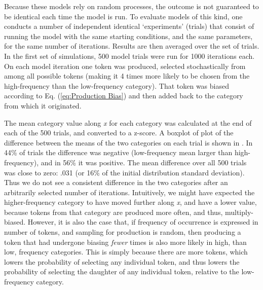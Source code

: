 Because these models rely on random processes, the outcome is not
guaranteed to be identical each time the model is run. To evaluate
models of this kind, one conducts a number of independent identical
`experiments' (trials) that consist of running the model with the
same starting conditions, and the same parameters, for the same number
of iterations. Results are then averaged over the set of trials. In
the first set of simulations, 500 model trials were run for 1000 iterations
each. On each model iteration one token was produced, selected stochastically
from among all possible tokens (making it 4 times more likely to be
chosen from the high-frequency than the low-frequency category). That
token was biased according to Eq. (\ref{eq:Production Bias}) and
then added back to the category from which it originated. 

The mean category value along \emph{x} for each category was calculated
at the end of each of the 500 trials, and converted to a z-score.
A boxplot of plot of the difference between the means of the two categories
on each trial is shown in . In 44\% of trials the
difference was negative (low-frequency mean larger than high-frequency),
and in 56\% it was positive. The mean difference over all 500 trials
was close to zero: .031 (or 16\% of the initial distribution standard
deviation). Thus we do not see a consistent difference in the two
categories after an arbitrarily selected number of iterations. Intuitively,
we might have expected the higher-frequency category to have moved
further along \emph{x}, and have a lower value, because tokens from
that category are produced more often, and thus, multiply-biased.
However, it is also the case that, if frequency of occurrence is expressed
in number of tokens, and sampling for production is random, then producing
a token that had undergone biasing \emph{fewer} times is also more
likely in high, than low, frequency categories. This is simply because
there are more tokens, which lowers the probability of selecting any
individual token, and thus lowers the probability of selecting the
daughter of any individual token, relative to the low-frequency category. 

